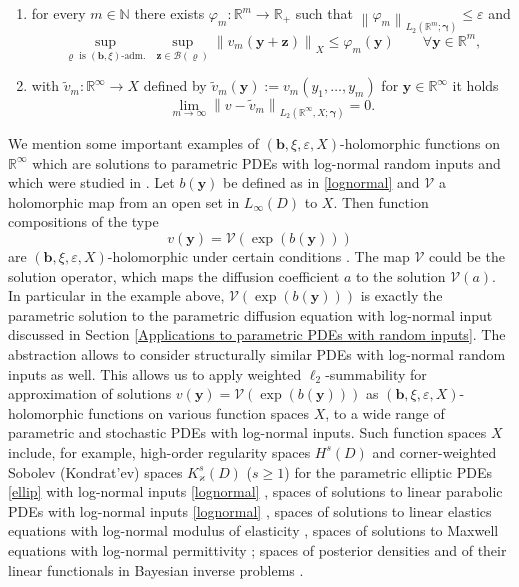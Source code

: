 \documentclass[11pt]{article}
\numberwithin{equation}{section}
\theoremstyle{definition}
\theoremstyle{remark}
\newcommand{\norm}[2]{\left\|{#1}\right\|_{#2}}
\newcommand{\bb}{{\boldsymbol{b}}}
\newcommand{\by}{{\boldsymbol{y}}}
\newcommand{\bz}{{\boldsymbol{z}}}
\newcommand{\bgamma}{{\boldsymbol{\gamma}}}
\newcommand{\bvarrho}{{\boldsymbol{\varrho}}}
\def\RR{{\mathbb R}}
\def\NN{{\mathbb N}}
\def\NN{{\mathbb N}}
\def\RR{{\mathbb R}}
\def\Vv{{\mathbb P}}
\def\Vv{{\mathcal P}}
\def\Bb{{\mathcal B}}
\def\RRi{{\mathbb R}^\infty}
\def\Bb{{\mathcal B}}
\def\Vv{{\mathcal V}}
\def\NN{{\mathbb N}}
\def\RRRi{{\mathbb R}^\infty}
\begin{document}
{\begin{enumerate}
	\item[{\rm (ii)}]\label{item:varphi} for every $m\in\NN$ there exists
	$\varphi_m:\RR^m\to\RR_+$ such that
	$\norm{\varphi_m}{L_2(\RR^m;\bgamma)}\le\varepsilon$ and
\begin{equation*} \label{ineq[phi]}
		\sup_{\text{{$\bvarrho$} is $(\bb,\xi)$-adm.}}~\sup_{\bz\in
			\Bb(\bvarrho)}\norm{v_m(\by+\bz)}{X}\le
		\varphi_m(\by)\qquad\forall\by\in\RR^m,
	\end{equation*}
	\item[{\rm (iii)}]\label{item:vN} with $\tilde v_m:\RRRi\to X$ defined by
	$\tilde v_m(\by) :=v_m(y_1,\dots,y_m)$ for $\by\in \RRRi$ it holds
	\begin{equation*}
		\lim_{m\to\infty}\norm{v-\tilde v_m}{ L_2(\RRi, X;\bgamma)}=0.
	\end{equation*}
\end{enumerate}

We mention some important examples of $(\bb,\xi,\varepsilon,X)$-holomorphic functions on $\RRi$ which are solutions to parametric PDEs with log-normal random inputs and which were studied in \cite{DNSZ2023}. 
Let $b(\by)$ be defined as in \eqref{lognormal} and $\Vv$ a holomorphic map from an open set in $L_\infty(D)$ to $X$. Then function compositions of the type 
$$
v(\by)= \Vv(\exp(b(\by)))
$$
are $(\bb,\xi,\varepsilon,X)$-holomorphic under certain conditions \cite[Proposition 4.11]{DNSZ2023}.
The map $\mathcal V$ could be the solution operator, which maps the diffusion coefficient $a$ to the solution $\mathcal V(a)$.
In particular in the example above, $\mathcal V(\exp(b(\by)))$ is exactly the parametric solution to the parametric diffusion equation with log-normal input discussed in Section \ref{Applications to parametric PDEs with random inputs}.
The abstraction allows to consider structurally similar PDEs with log-normal random inputs as well.
This allows us to apply weighted $\ell_2$-summability {for  approximation} of solutions $v(\by)= \Vv(\exp(b(\by)))$ as $(\bb,\xi,\varepsilon,X)$-holomorphic functions on various function spaces $X$, to a wide range of parametric and stochastic PDEs with log-normal inputs.
Such function spaces $X$ include, for example, high-order regularity spaces $H^s(D)$ \cite[Section 4.3.1]{DNSZ2023} and corner-weighted Sobolev (Kondrat'ev) spaces $K^s_\varkappa(D)$ ($s \ge 1$) for the parametric elliptic PDEs \eqref{ellip} with log-normal inputs \eqref{lognormal} \cite[Section 7.6.1]{DNSZ2023}, spaces of solutions to linear parabolic PDEs with log-normal inputs \eqref{lognormal} \cite[Section 4.3.2]{DNSZ2023}, spaces of solutions to linear elastics equations with log-normal modulus of elasticity 
\cite[Section 4.3.3]{DNSZ2023}, spaces of solutions to Maxwell equations with log-normal permittivity \cite[Section 4.3.4]{DNSZ2023}; spaces of posterior densities and of their linear functionals in Bayesian inverse problems \cite[Section 5]{DNSZ2023}.


}
\end{document}

